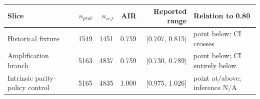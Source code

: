 \AccessibleTableHeaderRow
\begin{tabular}{@{}lrrrrl@{}}
\toprule
Slice & $n_{prot}$ & $n_{ref}$ & AIR & Reported range & Relation to 0.80 \\
\midrule
Historical fixture & 1549 & 1451 & 0.759 & [0.707, 0.815] & point below; CI crosses \\
Amplification branch & 5163 & 4837 & 0.759 & [0.730, 0.789] & point below; CI entirely below \\
Intrinsic parity-policy control & 5165 & 4835 & 1.000 & [0.975, 1.026] & point at/above; inference N/A \\
\bottomrule
\end{tabular}
